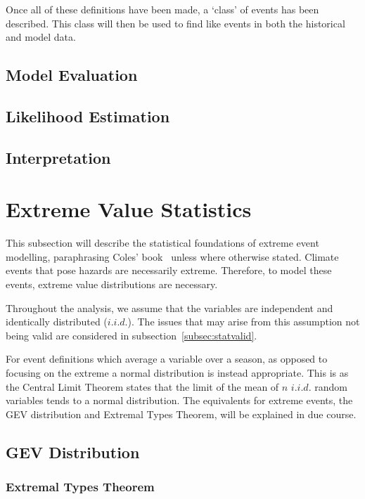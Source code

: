 Once all of these definitions have been made,
    a `class' of events has been described.
This class will then be used to find like events in both the historical and model data.

\subsection{Model Evaluation}\label{subsec:backmodeleval}

\subsection{Likelihood Estimation}\label{subsec:backlikeest}

\subsection{Interpretation}\label{subsec:backinterp}

\section{Extreme Value Statistics}\label{sec:exstats}

This subsection will describe the statistical foundations of extreme event modelling,
    paraphrasing Coles' book~\cite{Coles_2001} unless where otherwise stated.
Climate events that pose hazards are necessarily extreme.
Therefore, to model these events,
    extreme value distributions are necessary.

Throughout the analysis,
    we assume that the variables are independent and identically distributed ($i.i.d.$).
The issues that may arise from this assumption not being valid are considered in subsection~\ref{subsec:statvalid}.

For event definitions which average a variable over a season,
    as opposed to focusing on the extreme
    a normal distribution is instead appropriate.
This is as the Central Limit Theorem states that the limit of the mean of $n$ $i.i.d.$ random variables tends to a normal distribution.
The equivalents for extreme events, the GEV distribution and Extremal Types Theorem,
    will be explained in due course.

\subsection{GEV Distribution}\label{subsec:gev}

\subsubsection{Extremal Types Theorem}


